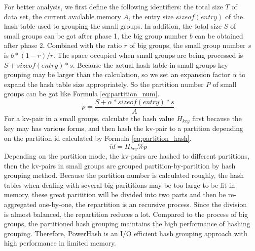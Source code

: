 For better analysis, we first define the following identifiers: the total size $T$ of data set, the current available memory $A$, the entry size $sizeof(entry)$ of the hash table used to grouping the small groups. In addition, the total size $S$ of small groups can be got after phase 1, the big group number $b$ can be obtained after phase 2. Combined with the ratio $r$ of big groups, the small group number $s$ is $b*(1-r)/r$. The space occupied when small groups are being processed is $S + sizeof(entry)*s$.
Because the actual hash table in small groups key grouping may be larger than the calculation, so we set an expansion factor $\alpha$ to expand the hash table size appropriately. So the partition number $P$ of small groups can be got like Formula \ref{eq:partition_num}. 
\begin{equation}\label{eq:partition_num}
    p = \dfrac{S + \alpha*sizeof(entry)*s}{A}
\end{equation}
For a kv-pair in a small groups, calculate the hash value $H_{key}$ first because the key may has various forms, and then hash the kv-pair to a partition depending on the partition id calculated by Formula \ref{eq:partition_hash}.
\begin{equation}\label{eq:partition_hash}
    id = H_{key} \%  p
\end{equation}  
Depending on the partition mode, the kv-pairs are hashed to different partitions, then the kv-pairs in small groups are grouped partition-by-partition by hash grouping method. Because the partition number is calculated roughly, the hash tables when dealing with several big parititions may be too large to be fit in memory, these great paritition will be divided into two parts and then be re-aggregated one-by-one, the repartition is an recursive process. Since the division is almost balanced, the repartition reduces a lot. Compared to the process of big groups, the partitioned hash grouping maintains the high performance of hashing grouping. Therefore, PowerHash is an I/O efficient hash grouping approach with high performance in limited memory.  

